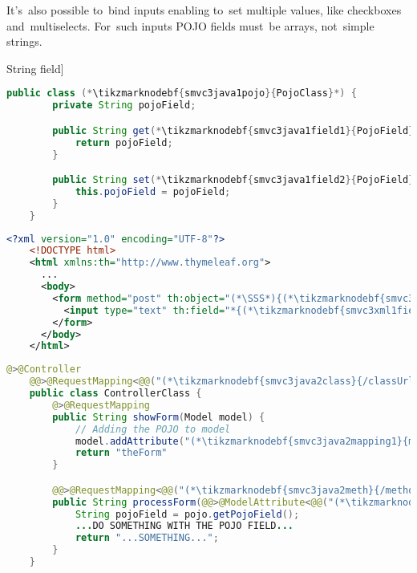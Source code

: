 It's~also possible to~bind inputs enabling to~set multiple values, like checkboxes and~multiselects.
For~such inputs POJO fields must~be arrays, not~simple strings.
\newpage

\examplenonl[binding text input to \hyperref[pojo]{POJO} String field]
\enlargethispage{20mm}
\thispagestyle{empty}
\begin{lstlisting}[language=Java, title={POJO class with one String field}]
    public class (*\tikzmarknodebf{smvc3java1pojo}{PojoClass}*) {
        private String pojoField;

        public String get(*\tikzmarknodebf{smvc3java1field1}{PojoField}*)() {
            return pojoField;
        }

        public String set(*\tikzmarknodebf{smvc3java1field2}{PojoField}*)(String pojoField) {
            this.pojoField = pojoField;
        }
    }
\end{lstlisting}
\begin{lstlisting}[language=XML, title={HTML form setting the field}]
    <?xml version="1.0" encoding="UTF-8"?>
    <!DOCTYPE html>
    <html xmlns:th="http://www.thymeleaf.org">
      ...
      <body>
        <form method="post" th:object="(*\SSS*){(*\tikzmarknodebf{smvc3xml1mapping}{mappingId}[ForestGreen]*)}" th:action="@{(*\tikzmarknodebf{smvc3xml1class}{/classUrl}[ForestGreen]\tikzmarknodebf{smvc3xml1meth}{/methodUrl}[ForestGreen]*)}">
          <input type="text" th:field="*{(*\tikzmarknodebf{smvc3xml1field}{pojoField}[ForestGreen]*)}">
        </form>
      </body>
    </html>
\end{lstlisting}
\begin{lstlisting}[language=Java, title={Controller displaying and processing the form}]
    @>@Controller
    @@>@RequestMapping<@@("(*\tikzmarknodebf{smvc3java2class}{/classUrl}[ForestGreen]*)")
    public class ControllerClass {
        @>@RequestMapping
        public String showForm(Model model) {
            // Adding the POJO to model
            model.addAttribute("(*\tikzmarknodebf{smvc3java2mapping1}{mappingId}[ForestGreen]*)", new (*\tikzmarknodebf{smvc3java2pojo1}{PojoClass}*)())
            return "theForm"
        }

        @@>@RequestMapping<@@("(*\tikzmarknodebf{smvc3java2meth}{/methodUrl}[ForestGreen]*)")
        public String processForm(@@>@ModelAttribute<@@("(*\tikzmarknodebf{smvc3java2mapping2}{mappingId}[ForestGreen]*)") (*\tikzmarknodebf{smvc3java2pojo2}{PojoClass}*) pojo) {
            String pojoField = pojo.getPojoField();
            ...DO SOMETHING WITH THE POJO FIELD...
            return "...SOMETHING...";
        }
    }
\end{lstlisting}
